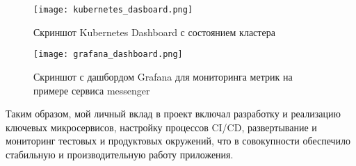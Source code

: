 \begin{figure}[h]
    \centering
    \texttt{[image: kubernetes\_dasboard.png]}
    \caption{Скриншот Kubernetes Dashboard с состоянием кластера}
    \label{kubernetes_dashboard}
\end{figure}

\begin{figure}[h]
    \centering
    \texttt{[image: grafana\_dashboard.png]}
    \caption{Скриншот с дашбордом Grafana для мониторинга метрик на примере сервиса messenger}
    \label{grafana_dasboard}
\end{figure}

Таким образом, мой личный вклад в проект включал разработку и реализацию ключевых микросервисов, настройку процессов CI/CD, развертывание и мониторинг тестовых и продуктовых окружений, что в совокупности обеспечило стабильную и производительную работу приложения.